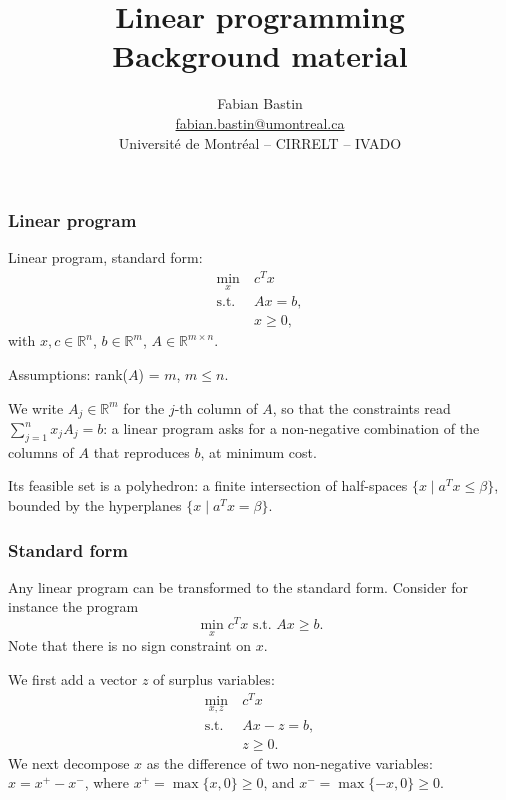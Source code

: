 \documentclass[aspectratio=169]{beamer}
\author[Fabian Bastin]{\texorpdfstring{Fabian Bastin \\ \url{fabian.bastin@umontreal.ca} \\ Université de Montréal -- CIRRELT -- IVADO}{Fabian Bastin}}
\date{}
\title[Linear programming]{Linear programming\\Background material}
\providecommand{\red}{\color{red}}
\def\RR{\mathbb{R}}
\begin{document}
\frame{\titlepage}

\begin{frame}
\frametitle{Linear program}

Linear program, standard form:
\begin{align*}
\min_x\ & c^Tx \\
\mbox{s.t. } & Ax = b,\\
& x \geq 0,
\end{align*}
with $x, c \in \RR^n$, $b \in \RR^m$, $A \in \RR^{m \times n}$.

\mbox{}

Assumptions: rank($A$) = $m$, $m \leq n$.

We write $A_j \in \RR^m$ for the $j$-th {\red column} of $A$, so that the constraints read $\sum_{j=1}^n x_j A_j = b$: a linear program asks for a {\red non-negative} combination of the columns of $A$ that reproduces $b$, at minimum cost.

\mbox{}

Its feasible set is a {\red polyhedron}: a finite intersection of {\red half-spaces} $\lbrace x \mid a^Tx \leq \beta \rbrace$, bounded by the {\red hyperplanes} $\lbrace x \mid a^Tx = \beta \rbrace$.

\end{frame}

\begin{frame}
\frametitle{Standard form}

Any linear program can be transformed to the standard form.
Consider for instance the program
\[
\min_x c^Tx \mbox{ s.t. } Ax \geq b.
\]
Note that there is no sign constraint on $x$.

\mbox{}

We first add a vector $z$ of surplus variables:
\begin{align*}
\min_{x,z}\ & c^Tx \\
\mbox{s.t. } & Ax - z = b,\\
& z \geq 0.
\end{align*}
We next decompose $x$ as the difference of two non-negative variables: $x = x^+-x^-$, where $x^+ = \max \lbrace x,
0 \rbrace \geq 0$, and $x^- = \max \lbrace -x, 0 \rbrace \geq 0$.
\end{frame}
\end{document}
